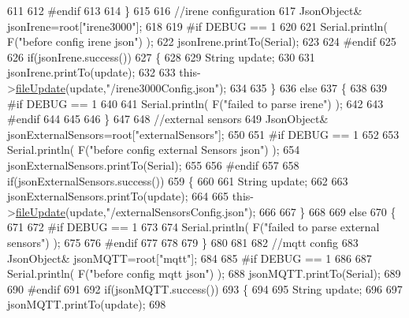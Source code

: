 \begin{DoxyCode}
611     
612 \textcolor{preprocessor}{    #endif}
613 
614     \}
615     
616     \textcolor{comment}{//irene configuration   }
617         JsonObject& jsonIrene=root[\textcolor{stringliteral}{"irene3000"}];
618     
619 \textcolor{preprocessor}{#if DEBUG == 1 }
620 
621     Serial.println( F(\textcolor{stringliteral}{"before config irene json"}) );    
622     jsonIrene.printTo(Serial);
623 
624 \textcolor{preprocessor}{#endif }
625 
626     \textcolor{keywordflow}{if}(jsonIrene.success())
627     \{
628 
629         String update;
630     
631         jsonIrene.printTo(update);
632 
633         this->\hyperlink{class_cool_file_system_a13f2958f5b87757c31fc53797a30d23a}{fileUpdate}(update,\textcolor{stringliteral}{"/irene3000Config.json"});     
634     
635     \}
636     \textcolor{keywordflow}{else}
637     \{
638     
639 \textcolor{preprocessor}{    #if DEBUG == 1 }
640 
641         Serial.println( F(\textcolor{stringliteral}{"failed to parse irene"}) );   
642     
643 \textcolor{preprocessor}{    #endif }
644 
645 
646     \}
647     
648     \textcolor{comment}{//external sensors}
649         JsonObject& jsonExternalSensors=root[\textcolor{stringliteral}{"externalSensors"}];
650 
651 \textcolor{preprocessor}{#if DEBUG == 1 }
652 
653     Serial.println( F(\textcolor{stringliteral}{"before config external Sensors json"}) );
654     jsonExternalSensors.printTo(Serial);
655 
656 \textcolor{preprocessor}{#endif}
657 
658     \textcolor{keywordflow}{if}(jsonExternalSensors.success())
659     \{
660 
661         String update;
662     
663         jsonExternalSensors.printTo(update);
664 
665         this->\hyperlink{class_cool_file_system_a13f2958f5b87757c31fc53797a30d23a}{fileUpdate}(update,\textcolor{stringliteral}{"/externalSensorsConfig.json"});       
666 
667     \}
668 
669     \textcolor{keywordflow}{else}
670     \{   
671 
672 \textcolor{preprocessor}{    #if DEBUG == 1}
673         
674         Serial.println( F(\textcolor{stringliteral}{"failed to parse external sensors"}) );
675 
676 \textcolor{preprocessor}{    #endif}
677 
678 
679     \}
680 
681     
682     \textcolor{comment}{//mqtt config}
683         JsonObject& jsonMQTT=root[\textcolor{stringliteral}{"mqtt"}];
684     
685 \textcolor{preprocessor}{#if DEBUG == 1 }
686 
687     Serial.println( F(\textcolor{stringliteral}{"before config mqtt json"}) );
688     jsonMQTT.printTo(Serial);
689 
690 \textcolor{preprocessor}{#endif}
691 
692     \textcolor{keywordflow}{if}(jsonMQTT.success())
693     \{
694 
695         String update;
696     
697         jsonMQTT.printTo(update);
698 

\end{DoxyCode}
